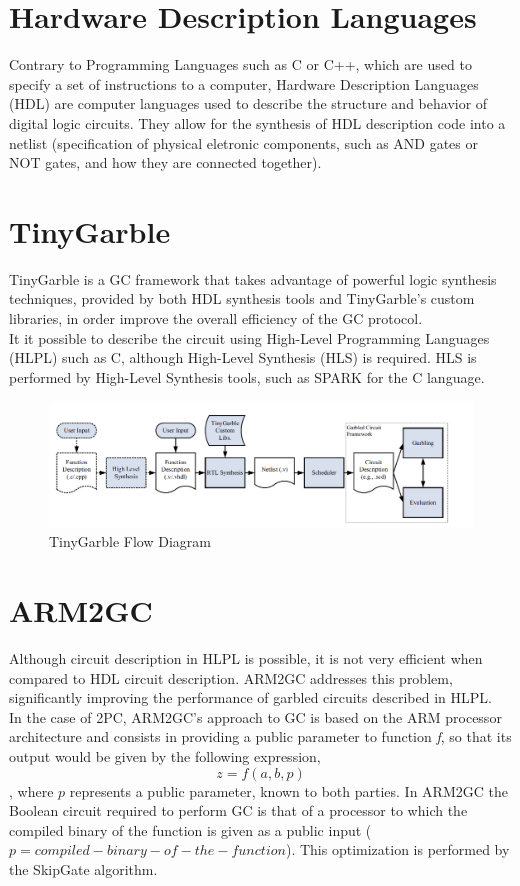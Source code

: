 \section{Hardware Description Languages}
Contrary to Programming Languages such as C or C++, which are used to specify a set of instructions to a computer, Hardware Description Languages (HDL) are computer languages used to describe the structure and behavior of digital logic circuits. They allow for the synthesis of HDL description code into a netlist (specification of physical eletronic components, such as AND gates or NOT gates, and how they are connected together).

\section{TinyGarble}
TinyGarble is a GC framework that takes advantage of powerful logic synthesis techniques, provided by both HDL synthesis tools
and TinyGarble's custom libraries, in order improve the overall efficiency of the GC protocol.\\
It it possible to describe the circuit using High-Level Programming Languages (HLPL) such as C, although High-Level Synthesis (HLS) is required. HLS is performed by High-Level Synthesis tools, such as SPARK for the C language.

\renewcommand{\figurename}{Figure}
\begin{figure}[H]
\centering
\includegraphics[width=.9\linewidth]{./figures/mpc/tinygarble_flow_diagram}
\caption{TinyGarble Flow Diagram}
\label{fig:tgdiagram}
\end{figure}

\section{ARM2GC}
Although circuit description in HLPL is possible, it is not very efficient when compared to HDL circuit description. ARM2GC addresses this problem, significantly improving the performance of garbled circuits described in HLPL.\\
In the case of 2PC, ARM2GC's approach to GC is based on the ARM processor architecture and consists in providing a public parameter to function \textit{f}, so that its output would be given by the following expression,
\begin{equation}\label{eq:arm2gc}
z = f(a,b,p)
\end{equation}
, where $p$ represents a public parameter, known to both parties.
In ARM2GC the Boolean circuit required to perform GC is that of a processor to which the compiled binary of the function is given as a public input ($p = compiled-binary-of-the-function$). This optimization is performed by the SkipGate algorithm.

 
